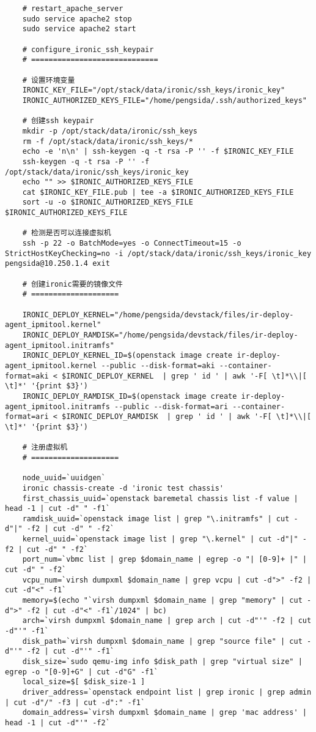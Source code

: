 \documentclass[a4paper,left=1.5cm,right=1.5cm,11pt]{article}
\begin{document}
\begin{lstlisting}
	# restart_apache_server
	sudo service apache2 stop
	sudo service apache2 start

	# configure_ironic_ssh_keypair
	# =============================
	
	# 设置环境变量
	IRONIC_KEY_FILE="/opt/stack/data/ironic/ssh_keys/ironic_key"
	IRONIC_AUTHORIZED_KEYS_FILE="/home/pengsida/.ssh/authorized_keys"

	# 创建ssh keypair
	mkdir -p /opt/stack/data/ironic/ssh_keys
	rm -f /opt/stack/data/ironic/ssh_keys/*
	echo -e 'n\n' | ssh-keygen -q -t rsa -P '' -f $IRONIC_KEY_FILE
	ssh-keygen -q -t rsa -P '' -f /opt/stack/data/ironic/ssh_keys/ironic_key
	echo "" >> $IRONIC_AUTHORIZED_KEYS_FILE
	cat $IRONIC_KEY_FILE.pub | tee -a $IRONIC_AUTHORIZED_KEYS_FILE
	sort -u -o $IRONIC_AUTHORIZED_KEYS_FILE $IRONIC_AUTHORIZED_KEYS_FILE
	
	# 检测是否可以连接虚拟机
	ssh -p 22 -o BatchMode=yes -o ConnectTimeout=15 -o StrictHostKeyChecking=no -i /opt/stack/data/ironic/ssh_keys/ironic_key pengsida@10.250.1.4 exit

	# 创建ironic需要的镜像文件
	# ====================

	IRONIC_DEPLOY_KERNEL="/home/pengsida/devstack/files/ir-deploy-agent_ipmitool.kernel"
	IRONIC_DEPLOY_RAMDISK="/home/pengsida/devstack/files/ir-deploy-agent_ipmitool.initramfs"
	IRONIC_DEPLOY_KERNEL_ID=$(openstack image create ir-deploy-agent_ipmitool.kernel --public --disk-format=aki --container-format=aki < $IRONIC_DEPLOY_KERNEL  | grep ' id ' | awk '-F[ \t]*\\|[ \t]*' '{print $3}')
	IRONIC_DEPLOY_RAMDISK_ID=$(openstack image create ir-deploy-agent_ipmitool.initramfs --public --disk-format=ari --container-format=ari < $IRONIC_DEPLOY_RAMDISK  | grep ' id ' | awk '-F[ \t]*\\|[ \t]*' '{print $3}')

	# 注册虚拟机
	# ====================

	node_uuid=`uuidgen`
	ironic chassis-create -d 'ironic test chassis'
	first_chassis_uuid=`openstack baremetal chassis list -f value | head -1 | cut -d" " -f1`
	ramdisk_uuid=`openstack image list | grep "\.initramfs" | cut -d"|" -f2 | cut -d" " -f2`
	kernel_uuid=`openstack image list | grep "\.kernel" | cut -d"|" -f2 | cut -d" " -f2`
	port_num=`vbmc list | grep $domain_name | egrep -o "| [0-9]+ |" | cut -d" " -f2`
	vcpu_num=`virsh dumpxml $domain_name | grep vcpu | cut -d">" -f2 | cut -d"<" -f1`
	memory=$(echo "`virsh dumpxml $domain_name | grep "memory" | cut -d">" -f2 | cut -d"<" -f1`/1024" | bc)
	arch=`virsh dumpxml $domain_name | grep arch | cut -d"'" -f2 | cut -d"'" -f1`
	disk_path=`virsh dumpxml $domain_name | grep "source file" | cut -d"'" -f2 | cut -d"'" -f1`
	disk_size=`sudo qemu-img info $disk_path | grep "virtual size" | egrep -o "[0-9]+G" | cut -d"G" -f1`
	local_size=$[ $disk_size-1 ]
	driver_address=`openstack endpoint list | grep ironic | grep admin | cut -d"/" -f3 | cut -d":" -f1`
	domain_address=`virsh dumpxml $domain_name | grep 'mac address' | head -1 | cut -d"'" -f2`


\end{lstlisting}
\end{document}

